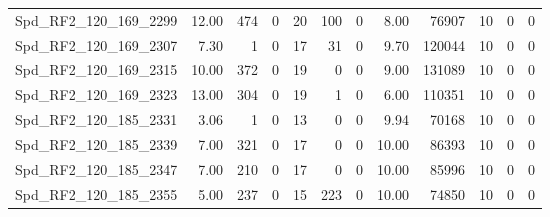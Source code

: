 \begin{longtable}[c]{@{}lrrrrrrrrrrr@{}}
Spd\_RF2\_120\_169\_2299     & 12.00                  & 474                     & 0                       & 20                     & 100                     & 0                       & 8.00                    & 76907                    & 10                       & 0                        & 0                        \\
Spd\_RF2\_120\_169\_2307     & 7.30                   & 1                       & 0                       & 17                     & 31                      & 0                       & 9.70                    & 120044                   & 10                       & 0                        & 0                        \\
Spd\_RF2\_120\_169\_2315     & 10.00                  & 372                     & 0                       & 19                     & 0                       & 0                       & 9.00                    & 131089                   & 10                       & 0                        & 0                        \\
Spd\_RF2\_120\_169\_2323     & 13.00                  & 304                     & 0                       & 19                     & 1                       & 0                       & 6.00                    & 110351                   & 10                       & 0                        & 0                        \\
Spd\_RF2\_120\_185\_2331     & 3.06                   & 1                       & 0                       & 13                     & 0                       & 0                       & 9.94                    & 70168                    & 10                       & 0                        & 0                        \\
Spd\_RF2\_120\_185\_2339     & 7.00                   & 321                     & 0                       & 17                     & 0                       & 0                       & 10.00                   & 86393                    & 10                       & 0                        & 0                        \\
Spd\_RF2\_120\_185\_2347     & 7.00                   & 210                     & 0                       & 17                     & 0                       & 0                       & 10.00                   & 85996                    & 10                       & 0                        & 0                        \\
Spd\_RF2\_120\_185\_2355     & 5.00                   & 237                     & 0                       & 15                     & 223                     & 0                       & 10.00                   & 74850                    & 10                       & 0                        & 0                        \\

\end{longtable}

